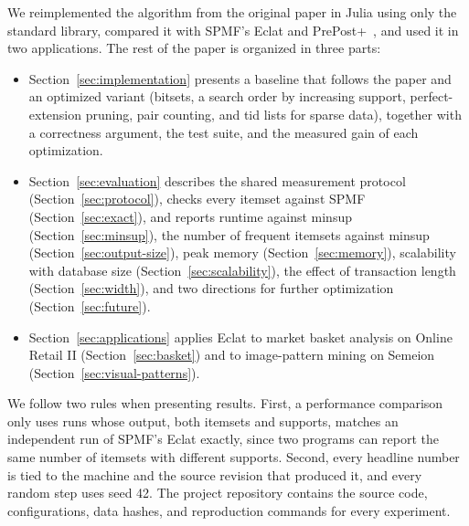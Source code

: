 We reimplemented the algorithm from the original
paper in Julia using only the standard library, compared it with SPMF's Eclat and
PrePost+~\cite{spmf2016}, and used it in two applications. The rest of the paper is
organized in three parts:
\begin{itemize}
\item Section~\ref{sec:implementation} presents a baseline that follows the paper and an
optimized variant (bitsets, a search order by increasing support, perfect-extension
pruning, pair counting, and tid lists for sparse data), together with a correctness
argument, the test suite, and the measured gain of each optimization.
\item Section~\ref{sec:evaluation} describes the shared measurement protocol
(Section~\ref{sec:protocol}), checks every itemset against SPMF
(Section~\ref{sec:exact}), and reports runtime against minsup
(Section~\ref{sec:minsup}), the number of frequent itemsets against minsup
(Section~\ref{sec:output-size}), peak memory (Section~\ref{sec:memory}), scalability
with database size (Section~\ref{sec:scalability}), the effect of transaction length
(Section~\ref{sec:width}), and two directions for further optimization
(Section~\ref{sec:future}).
\item Section~\ref{sec:applications} applies Eclat to market basket analysis on Online
Retail II (Section~\ref{sec:basket}) and to image-pattern mining on Semeion
(Section~\ref{sec:visual-patterns}).
\end{itemize}

We follow two rules when presenting results. First, a performance comparison only uses
runs whose output, both itemsets and supports, matches an independent run of SPMF's
Eclat exactly, since two programs can report the same number of itemsets with different
supports. Second, every headline number is tied to the machine and the source revision
that produced it, and every random step uses seed 42. The project repository contains the
source code, configurations, data hashes, and reproduction commands for every experiment.
